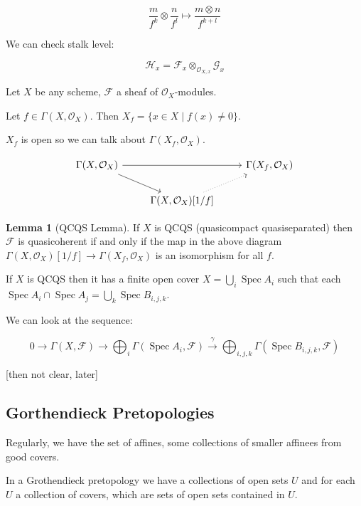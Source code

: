 \documentclass{article}
\theoremstyle{definition}
\newtheorem{lemma}[theorem]{Lemma}
\begin{document}
    \[
        \frac{m}{f^k} \otimes \frac{n}{f^l} \mapsto \frac{m \otimes n}{f^{k+l}}
    \]

    We can check stalk level:

    \[
        \mathcal{H}_x = \mathcal{F}_x \otimes_{\mathcal{O}_{X,x}} \mathcal{G}_x
    \]

    Let \(X\) be any scheme, \(\mathcal{F}\) a sheaf of \(\mathcal{O}_X\)-modules.

    Let \(f \in \Gamma(X, \mathcal{O}_X)\). Then \(X_f = \{ x\in X \mid f(x) \neq 0 \} \).

    \(X_f\) is open so we can talk about \(\Gamma (X_f, \mathcal{O}_X)\).

    \[
        \begin{tikzcd}
            \Gamma (X, \mathcal{O}_X) \ar[rr] \ar[rd] & & \Gamma (X_f, \mathcal{O}_X) \\ & \Gamma (X, \mathcal{O}_X)[1 / f] \ar[ur, dotted]
        \end{tikzcd}
    \]


    \begin{lemma}
        [QCQS Lemma] If \(X\) is QCQS (quasicompact quasiseparated) then \(\mathcal{F}\) is quasicoherent if and only if the map in the above diagram \(\Gamma (X, \mathcal{O} _X)[1 / f] \to \Gamma(X_f, \mathcal{O}_X)\) is an isomorphism for all \(f\).
    \end{lemma}

    If \(X\) is QCQS then it has a finite open cover \(X = \bigcup_{i} \operatorname{Spec} A_i\) such that each \(\operatorname{Spec} A_i \cap \operatorname{Spec} A_j = \bigcup_{k} \operatorname{Spec} B_{i,j,k}\).

    We can look at the sequence:

    \[
        0 \to \Gamma (X, \mathcal{F}) \to \bigoplus_{i} \Gamma (\operatorname{Spec} A_i, \mathcal{F}) \xrightarrow{\gamma} \bigoplus_{i,j,k} \Gamma (\operatorname{Spec} B_{i,j,k}, \mathcal{F})
    \]

    [then not clear, later]

    \subsection*{Gorthendieck Pretopologies}

    Regularly, we have the set of affines, some collections of smaller affinees from good covers.

    In a Grothendieck pretopology we have a collections of open sets \(U\) and for each \(U\) a collection of covers, which are sets of open sets contained in \(U\).
\end{document}

